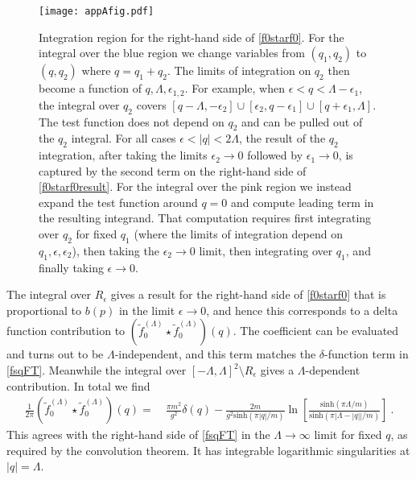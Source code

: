 \def\letter{0}\def\pr{0}\documentclass[a4paper,12pt, epsfig]{article}
\renewcommand{\sinh}{\textrm{sinh}}
\renewcommand{\(}{\begin{equation}}
\renewcommand{\)}{end{equation} \vspace{-.05in}\linebreak}
\renewcommand{\=}{\hspace{-.03in}=\hspace{-.02in}}
\renewcommand{\(}{\begin{equation}}
\renewcommand{\)}{\end{equation}}
\renewcommand{\(}{\begin{equation}}
\renewcommand{\)}{\end{equation}}
\begin{document}
\begin{figure}
\begin{center}
\texttt{[image: appAfig.pdf]}
\end{center}
\caption{Integration region for the right-hand side of \eqref{f0starf0}.  For the integral over the blue region we change variables from $(q_1,q_2)$ to $(q,q_2)$ where $q = q_1 + q_2$.  The limits of integration on $q_2$ then become a function of $q,\Lambda,\epsilon_{1,2}$.  For example, when $\epsilon < q < \Lambda - \epsilon_1$, the integral over $q_2$ covers $[q-\Lambda,-\epsilon_2] \cup [\epsilon_2, q - \epsilon_1] \cup [q + \epsilon_1, \Lambda]$.  The test function does not depend on $q_2$ and can be pulled out of the $q_2$ integral.  For all cases $\epsilon < |q| < 2\Lambda$, the result of the $q_2$ integration, after taking the limits $\epsilon_2 \to 0$ followed by $\epsilon_1 \to 0$, is captured by the second term on the right-hand side of \eqref{f0starf0result}.  For the integral over the pink region we instead expand the test function around $q = 0$ and compute leading term in the resulting integrand.  That computation requires first integrating over $q_2$ for fixed $q_1$ (where the limits of integration depend on $q_1,\epsilon,\epsilon_2$), then taking the $\epsilon_2 \to 0$ limit, then integrating over $q_1$, and finally taking $\epsilon \to 0$.}
\label{appAfig}
\end{figure}


The integral over $R_\epsilon$ gives a result for the right-hand side of \eqref{f0starf0} that is proportional to $b(p)$ in the limit $\epsilon \to 0$, and hence this corresponds to a delta function contribution to $(\tilde{f}_{0}^{(\Lambda)} \star \tilde{f}_{0}^{(\Lambda)})(q)$.  The coefficient can be evaluated and turns out to be $\Lambda$-independent, and this term matches the $\delta$-function term in \eqref{fsqFT}.  Meanwhile the integral over $[-\Lambda, \Lambda]^2 \setminus R_\epsilon$ gives a $\Lambda$-dependent contribution.  In total we find
%
\begin{align}\label{f0starf0result}
\frac{1}{2\pi} \left(\tilde{f}_{0}^{(\Lambda)} \star \tilde{f}_{0}^{(\Lambda)}\right)(q) =&~  \frac{\pi m^2}{g^2} \delta(q) - \frac{2m}{g^2 \sinh(\pi |q|/m)} \ln \left[ \frac{\sinh(\pi \Lambda/m)}{\sinh(\pi |\Lambda - |q| |/m)} \right]~.
\end{align}
%
This agrees with the right-hand side of \eqref{fsqFT} in the $\Lambda \to \infty$ limit for fixed $q$, as required by the convolution theorem.  It has integrable logarithmic singularities at $|q| = \Lambda$.
\end{document}
